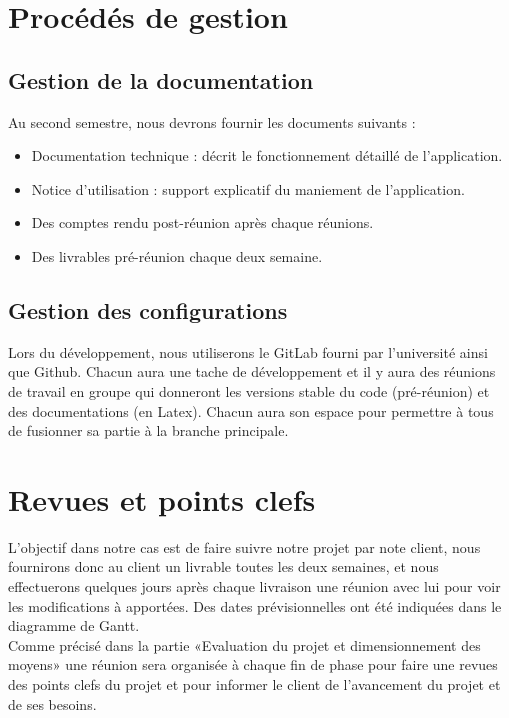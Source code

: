 \chapter{Procédés de gestion}
\section{Gestion de la documentation}
		Au second semestre, nous devrons fournir les documents suivants :
		\begin{itemize}
			\item Documentation technique : décrit le fonctionnement détaillé de l’application.
			\item Notice d’utilisation : support explicatif du maniement de l’application.
			\item Des comptes rendu post-réunion après chaque réunions.
			\item Des livrables pré-réunion chaque deux semaine.\\ \newline
		\end{itemize}
	
		\section{Gestion des configurations}
		Lors du développement, nous utiliserons le GitLab fourni par l’université ainsi que Github. Chacun
		aura une tache de développement et il y aura des réunions de travail en groupe qui donneront les versions
		stable du code (pré-réunion) et des documentations (en Latex). Chacun aura son espace pour
		permettre à tous de fusionner sa partie à la branche principale.



\chapter{Revues et points clefs}

L'objectif dans notre cas est de faire suivre notre projet par note client,
nous fournirons donc au client un livrable toutes les deux semaines, et nous effectuerons
quelques jours après chaque livraison une réunion avec lui pour voir les modifications à
apportées. Des dates prévisionnelles ont été indiquées dans le diagramme de Gantt.\\

Comme précisé dans la partie «Evaluation du projet et dimensionnement des moyens» une réunion sera organisée à chaque fin de phase pour faire 
une revues des points clefs du projet et pour informer le client de l'avancement du projet et de ses besoins.

